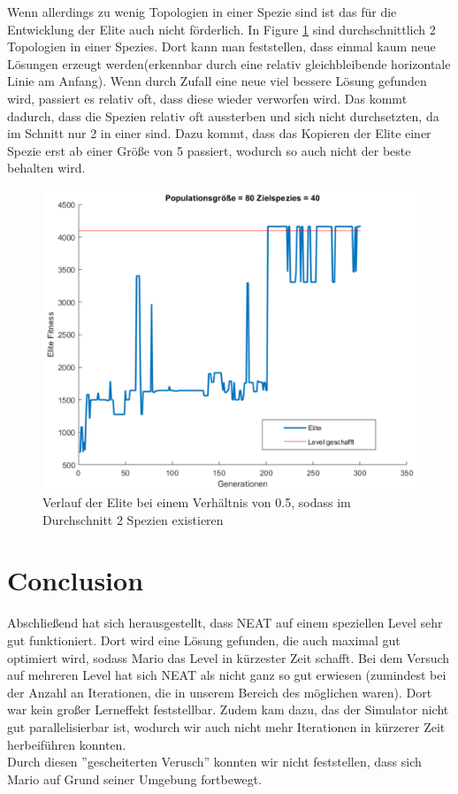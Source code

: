 \documentclass{hbrs-ecta-report}
\begin{document}
Wenn allerdings zu wenig Topologien in einer Spezie sind ist das für die Entwicklung der Elite auch nicht förderlich. In Figure \ref{fig:Verhaeltniss0_5} sind durchschnittlich 2 Topologien in einer Spezies. Dort kann man feststellen, dass einmal kaum neue Lösungen erzeugt werden(erkennbar durch eine relativ gleichbleibende horizontale Linie am Anfang). Wenn durch Zufall eine neue viel bessere Lösung gefunden wird, passiert es relativ oft, dass diese wieder verworfen wird. Das kommt dadurch, dass die Spezien relativ oft aussterben und sich nicht durchsetzten, da im Schnitt nur 2 in einer sind. Dazu kommt, dass das Kopieren der Elite einer Spezie erst ab einer Größe von 5 passiert, wodurch so auch nicht der beste behalten wird.\\
 
\begin{figure}[h!]
\centering
\includegraphics[width=\linewidth]{img/Mario_80_Netze_target_40.png}
\caption{Verlauf der Elite bei einem Verhältnis von 0.5, sodass im Durchschnitt 2 Spezien existieren}
\label{fig:Verhaeltniss0_5} 
\end{figure}



\FloatBarrier
\newpage
\section{Conclusion}
Abschließend hat sich herausgestellt, dass NEAT auf einem speziellen Level sehr gut funktioniert. Dort wird eine Lösung gefunden, die auch maximal gut optimiert wird, sodass Mario das Level in kürzester Zeit schafft. Bei dem Versuch auf mehreren Level hat sich NEAT als nicht ganz so gut erwiesen (zumindest bei der Anzahl an Iterationen, die in unserem Bereich des möglichen waren). Dort war kein großer Lerneffekt feststellbar. Zudem kam dazu, das der Simulator nicht gut parallelisierbar ist, wodurch wir auch nicht mehr Iterationen in kürzerer Zeit herbeiführen konnten. \\
Durch diesen ''gescheiterten Verusch'' konnten wir nicht feststellen, dass sich Mario auf Grund seiner Umgebung fortbewegt.\\
\end{document}

